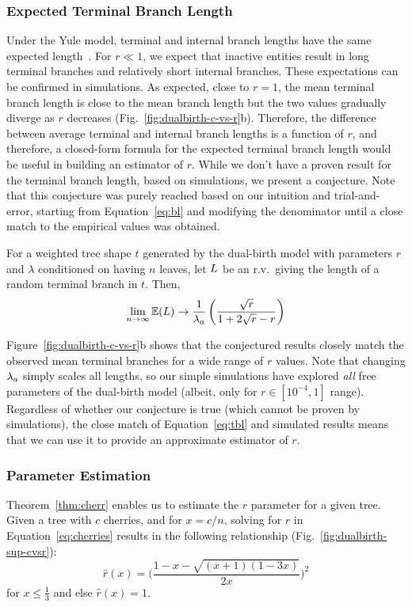 \subsubsection{Expected Terminal Branch Length}
Under the Yule model, terminal and internal branch lengths have the same expected length~\cite{Mooers2012}. For $r\ll1$, we expect that inactive entities result in long terminal branches and relatively short internal branches. These expectations can be confirmed in simulations. As expected, close to $r=1$, the mean terminal branch length is close to the mean branch length but the two values gradually diverge as $r$ decreases (Fig.~\ref{fig:dualbirth-c-vs-r}b). Therefore, the difference between average terminal and internal branch lengths is a function of $r$, and therefore, a closed-form formula for the expected terminal branch length would be useful in building an estimator of $r$. While we don't have a proven result for the terminal branch length, based on simulations, we present a conjecture. Note that this conjecture was purely reached based on our intuition and trial-and-error, starting from Equation~\ref{eq:bl} and modifying the denominator until a close match to the empirical values was obtained.

\begin{conjecture}\label{thm:tbl}
For a weighted tree shape $t$ generated by the dual-birth model with parameters $r$ and $\lambda$ conditioned on having $n$ leaves, let $L$ be an r.v.\ giving the length of a random terminal branch in $t$. Then, 
\begin{align}\label{eq:tbl}
\lim_{n\to\infty}\mathbb{E}(L)\to\frac{1}{\lambda_a}\left(\frac{\sqrt{r}}{1+2\sqrt{r}-r}\right)
\end{align}
\end{conjecture}

Figure~\ref{fig:dualbirth-c-vs-r}b shows that the conjectured results closely match the observed mean terminal branches for a wide range of $r$ values. Note that changing $\lambda_a$ simply scales all lengths, so our simple simulations have explored \textit{all} free parameters of the dual-birth model (albeit, only for $r\in[10^{-4},1]$ range). Regardless of whether our conjecture is true (which cannot be proven by simulations), the close match of Equation~\ref{eq:tbl} and simulated results means that we can use it to provide an approximate estimator of $r$.

\subsubsection{Parameter Estimation}\label{sec:paramest}
Theorem~\ref{thm:cherr} enables us to estimate the $r$ parameter for a given tree. Given a tree with $c$ cherries, and for $x=c/n$, solving for $r$ in Equation~\ref{eq:cherries} results in the following relationship (Fig.~\ref{fig:dualbirth-sup-cvsr}):
\begin{equation}\label{eq:rforc}
\hat{r}(x)=\bigg(\frac{1-x-\sqrt{(x+1)(1-3x)}}{2x}\bigg)^2
\end{equation}
for $x\leq \frac{1}{3}$ and else $\hat{r}(x)=1$.

